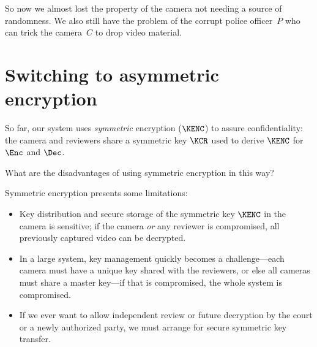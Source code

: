 So now we almost lost the property of the camera not needing a source of 
randomness.
We also still have the problem of the corrupt police officer~\(P\) who can 
trick the camera~\(C\) to drop video material.


\section{Switching to asymmetric encryption}\label{AsymmetricEncryption}


So far, our system uses \emph{symmetric} encryption (\(\KENC\)) to assure
confidentiality: the camera and reviewers share a symmetric key \(\KCR\) used 
to derive \(\KENC\) for \(\Enc\) and \(\Dec\).

\begin{exercise}
  What are the disadvantages of using symmetric encryption in this way?
\end{exercise}
Symmetric encryption presents some limitations:
\begin{itemize}
  \item Key distribution and secure storage of the symmetric key \(\KENC\) in 
    the camera is sensitive; if the camera \emph{or} any reviewer is 
    compromised, all previously captured video can be decrypted.
  \item In a large system, key management quickly becomes a challenge---each 
    camera must have a unique key shared with the reviewers, or else all 
    cameras must share a master key---if that is compromised, the whole system 
    is compromised.
  \item If we ever want to allow independent review or future decryption by the 
    court or a newly authorized party, we must arrange for secure symmetric key 
    transfer.
\end{itemize}

